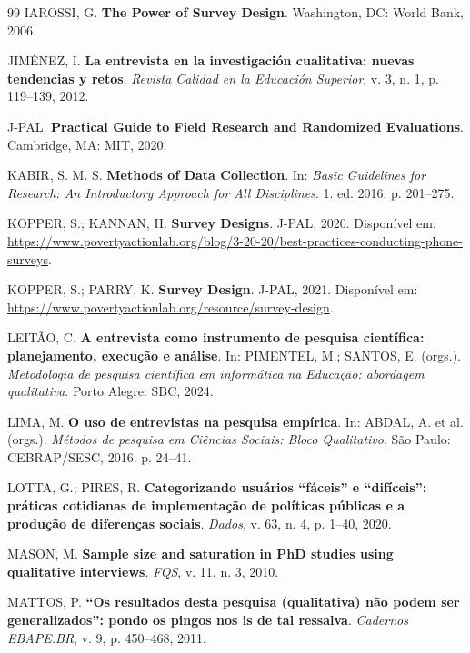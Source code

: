 \documentclass[12pt, a4paper, openany]{book}
\begin{document}
\begin{thebibliography}{99}
IAROSSI, G. \textbf{The Power of Survey Design}. Washington, DC: World Bank, 2006.

JIM\'ENEZ, I. \textbf{La entrevista en la investigaci\'on cualitativa: nuevas tendencias y retos}. \textit{Revista Calidad en la Educaci\'on Superior}, v. 3, n. 1, p. 119--139, 2012.

J-PAL. \textbf{Practical Guide to Field Research and Randomized Evaluations}. Cambridge, MA: MIT, 2020.

KABIR, S. M. S. \textbf{Methods of Data Collection}. In: \textit{Basic Guidelines for Research: An Introductory Approach for All Disciplines}. 1. ed. 2016. p. 201--275.

KOPPER, S.; KANNAN, H. \textbf{Survey Designs}. J-PAL, 2020. Dispon\'ivel em: \url{https://www.povertyactionlab.org/blog/3-20-20/best-practices-conducting-phone-surveys}.

KOPPER, S.; PARRY, K. \textbf{Survey Design}. J-PAL, 2021. Dispon\'ivel em: \url{https://www.povertyactionlab.org/resource/survey-design}.

LEIT\~AO, C. \textbf{A entrevista como instrumento de pesquisa cient\'ifica: planejamento, execu\c{c}\~ao e an\'alise}. In: PIMENTEL, M.; SANTOS, E. (orgs.). \textit{Metodologia de pesquisa cient\'ifica em inform\'atica na Educa\c{c}\~ao: abordagem qualitativa}. Porto Alegre: SBC, 2024.

LIMA, M. \textbf{O uso de entrevistas na pesquisa emp\'irica}. In: ABDAL, A. et al. (orgs.). \textit{M\'etodos de pesquisa em Ci\^encias Sociais: Bloco Qualitativo}. S\~ao Paulo: CEBRAP/SESC, 2016. p. 24--41.

LOTTA, G.; PIRES, R. \textbf{Categorizando usu\'arios ``f\'aceis'' e ``dif\'iceis'': pr\'aticas cotidianas de implementa\c{c}\~ao de pol\'iticas p\'ublicas e a produ\c{c}\~ao de diferen\c{c}as sociais}. \textit{Dados}, v. 63, n. 4, p. 1--40, 2020.

MASON, M. \textbf{Sample size and saturation in PhD studies using qualitative interviews}. \textit{FQS}, v. 11, n. 3, 2010.

MATTOS, P. \textbf{``Os resultados desta pesquisa (qualitativa) n\~ao podem ser generalizados'': pondo os pingos nos is de tal ressalva}. \textit{Cadernos EBAPE.BR}, v. 9, p. 450--468, 2011.


\end{thebibliography}
\end{document}
